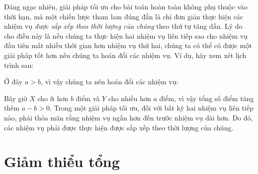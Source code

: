Đáng ngạc nhiên, giải pháp tối ưu cho bài toán
hoàn toàn không phụ thuộc vào thời hạn,
mà một chiến lược tham lam đúng đắn là chỉ đơn giản
thực hiện các nhiệm vụ \emph{được sắp xếp theo thời lượng của chúng}
theo thứ tự tăng dần.
Lý do cho điều này là nếu chúng ta thực hiện
hai nhiệm vụ liên tiếp sao cho nhiệm vụ đầu tiên
mất nhiều thời gian hơn nhiệm vụ thứ hai,
chúng ta có thể có được một giải pháp tốt hơn nếu chúng ta hoán đổi các nhiệm vụ.
Ví dụ, hãy xem xét lịch trình sau:
\begin{center}
\end{center}
Ở đây $a>b$, vì vậy chúng ta nên hoán đổi các nhiệm vụ:
\begin{center}
\end{center}
Bây giờ $X$ cho ít hơn $b$ điểm và $Y$ cho nhiều hơn $a$ điểm,
vì vậy tổng số điểm tăng thêm $a-b > 0$.
Trong một giải pháp tối ưu,
đối với bất kỳ hai nhiệm vụ liên tiếp nào,
phải thỏa mãn rằng nhiệm vụ ngắn hơn đến
trước nhiệm vụ dài hơn.
Do đó, các nhiệm vụ phải được thực hiện
được sắp xếp theo thời lượng của chúng.

\section{Giảm thiểu tổng}


